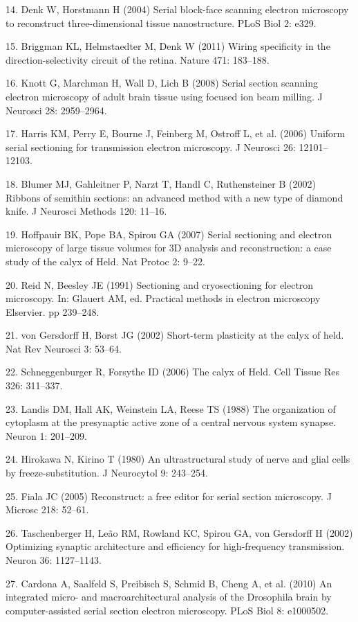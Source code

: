 \documentclass{article}
\begin{document}
\begin{hangpars}
14. Denk W, Horstmann H (2004) Serial block-face scanning electron microscopy to reconstruct three-dimensional tissue nanostructure. PLoS Biol 2: e329.

15. Briggman KL, Helmstaedter M, Denk W (2011) Wiring specificity in the direction-selectivity circuit of the retina. Nature 471: 183–188.

16. Knott G, Marchman H, Wall D, Lich B (2008) Serial section scanning electron microscopy of adult brain tissue using focused ion beam milling. J Neurosci 28: 2959–2964.

17. Harris KM, Perry E, Bourne J, Feinberg M, Ostroff L, et al. (2006) Uniform serial sectioning for transmission electron microscopy. J Neurosci 26: 12101–12103.

18. Blumer MJ, Gahleitner P, Narzt T, Handl C, Ruthensteiner B (2002) Ribbons of semithin sections: an advanced method with a new type of diamond knife. J Neurosci Methods 120: 11–16.

19. Hoffpauir BK, Pope BA, Spirou GA (2007) Serial sectioning and electron microscopy of large tissue volumes for 3D analysis and reconstruction: a case study of the calyx of Held. Nat Protoc 2: 9–22.

20. Reid N, Beesley JE (1991) Sectioning and cryosectioning for electron microscopy. In: Glauert AM, ed. Practical methods in electron microscopy Elservier. pp 239–248.

21. von Gersdorff H, Borst JG (2002) Short-term plasticity at the calyx of held. Nat Rev Neurosci 3: 53–64.

22. Schneggenburger R, Forsythe ID (2006) The calyx of Held. Cell Tissue Res 326: 311–337.

23. Landis DM, Hall AK, Weinstein LA, Reese TS (1988) The organization of cytoplasm at the presynaptic active zone of a central nervous system synapse. Neuron 1: 201–209.

24. Hirokawa N, Kirino T (1980) An ultrastructural study of nerve and glial cells by freeze-substitution. J Neurocytol 9: 243–254.

25. Fiala JC (2005) Reconstruct: a free editor for serial section microscopy. J Microsc 218: 52–61.

26. Taschenberger H, Leão RM, Rowland KC, Spirou GA, von Gersdorff H (2002) Optimizing synaptic architecture and efficiency for high-frequency transmission. Neuron 36: 1127–1143.

27. Cardona A, Saalfeld S, Preibisch S, Schmid B, Cheng A, et al. (2010) An integrated micro- and macroarchitectural analysis of the Drosophila brain by computer-assisted serial section electron microscopy. PLoS Biol 8: e1000502.


\end{hangpars}
\end{document}

